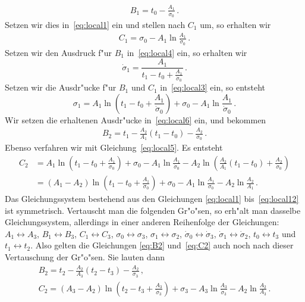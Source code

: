 \documentclass[a4paper]{scrartcl}
\begin{document}
\begin{align} \label{eq:B1}
  B_1=t_0-\frac{A_1}{\dot\sigma_0}\,.
\end{align}
Setzen wir dies in~\eqref{eq:local1} ein und stellen nach $C_1$ um, so erhalten wir
\begin{align} \label{eq:C1}
  C_1=\sigma_0-A_1\ln\frac{A_1}{\dot\sigma_0}\,.
\end{align}
Setzen wir den Ausdruck f"ur $B_1$ in~\eqref{eq:local4} ein, so erhalten wir 
$$ \dot\sigma_1 = \frac{A_1}{t_1-t_0+\frac{A_1}{\dot\sigma_0}}\,. $$
Setzen wir die Ausdr"ucke f"ur $B_1$ und $C_1$ in~\eqref{eq:local3} ein, so entsteht
$$ \sigma_1 = A_1\ln\left(t_1-t_0+\frac{A_1}{\dot\sigma_0}\right)+\sigma_0-A_1\ln\frac{A_1}{\dot\sigma_0}\,. $$
Wir setzen die erhaltenen Ausdr"ucke in~\eqref{eq:local6} ein, und bekommen
\begin{align} \label{eq:B2}
  B_2 = t_1-\frac{A_2}{A_1}(t_1-t_0)-\frac{A_2}{\dot\sigma_0}\,.
\end{align}
Ebenso verfahren wir mit Gleichung~\eqref{eq:local5}. Es entsteht
\begin{equation} \label{eq:C2}
\begin{split}
  C_2 
  &= A_1\ln\left(t_1-t_0+\frac{A_1}{\dot\sigma_0}\right)+\sigma_0-A_1\ln\frac{A_1}{\dot\sigma_0}-A_2\ln\left(\frac{A_2}{A_1}(t_1-t_0)+\frac{A_2}{\dot\sigma_0}\right) \\
  &= (A_1-A_2)\ln\left(t_1-t_0+\frac{A_1}{\dot\sigma_0}\right)+\sigma_0-A_1\ln\frac{A_1}{\dot\sigma_0}-A_2\ln\frac{A_2}{A_1}\,.
\end{split}
\end{equation}
Das Gleichungssystem bestehend aus den Gleichungen \eqref{eq:local1} bis~\eqref{eq:local12} ist symmetrisch. Vertauscht man die folgenden Gr"o"sen, so erh"alt man dasselbe Gleichungssystem, allerdings in einer anderen Reihenfolge der Gleichungen: $A_1\leftrightarrow A_3$, $B_1\leftrightarrow B_3$, $C_1\leftrightarrow C_3$, $\sigma_0\leftrightarrow \sigma_3$, $\sigma_1\leftrightarrow \sigma_2$, $\dot\sigma_0\leftrightarrow \dot\sigma_3$, $\dot\sigma_1\leftrightarrow \dot\sigma_2$, $t_0\leftrightarrow t_3$ und $t_1\leftrightarrow t_2$. Also gelten die Gleichungen \eqref{eq:B2} und~\eqref{eq:C2} auch noch nach dieser Vertauschung der Gr"o"sen. Sie lauten dann 
\begin{gather}
  \label{eq:B2symm}
  B_2 = t_2-\frac{A_2}{A_3}(t_2-t_3)-\frac{A_2}{\dot\sigma_3}\,, \\
  \label{eq:C2symm}
  C_2 = (A_3-A_2)\ln\left(t_2-t_3+\frac{A_3}{\dot\sigma_3}\right)+\sigma_3-A_3\ln\frac{A_3}{\dot\sigma_3}-A_2\ln\frac{A_2}{A_3}\,.
\end{gather}
\end{document}
